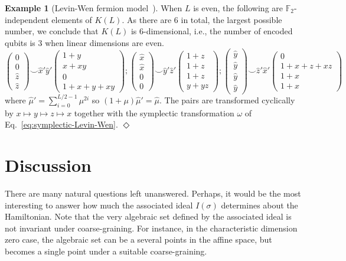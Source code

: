 \documentclass[letterpaper,12pt]{amsart}
\theoremstyle{definition} \newtheorem{defn}{Definition}
\theoremstyle{definition} \newtheorem{rem}{Remark}
\theoremstyle{definition} \newtheorem{example}{Example}
\newcommand{\FF}{\mathbb{F}}
\begin{document}
\begin{example}[Levin-Wen fermion model~\cite{LevinWen2003Fermions}]
When $L$ is even, the following are $\FF_2$-independent elements of $K(L)$.
As there are 6 in total, the largest possible number, we conclude that $K(L)$ is 6-dimensional,
i.e., the number of encoded qubits is 3 when linear dimensions are even.
\[
 \begin{pmatrix}  0 \\ 0 \\ \widehat z \\ \widehat z \end{pmatrix}
\smile
 \widehat x ' \widehat y '
 \begin{pmatrix}  1+y \\ x+xy \\ 0 \\ 1+x+y+xy \end{pmatrix}
%
 ;
%
 \begin{pmatrix}  \widehat x \\ \widehat x \\ 0 \\ 0 \end{pmatrix}
\smile
 \widehat y ' \widehat z '
 \begin{pmatrix}  1+z \\ 1+z \\ 1+z \\ y+yz \end{pmatrix}
%
  ;
%
 \begin{pmatrix}  \widehat y \\ \widehat y \\ \widehat y \\ \widehat y \end{pmatrix}
\smile 
 \widehat z ' \widehat x '
 \begin{pmatrix}  0 \\ 1+x+z+xz \\ 1+x \\ 1+x \end{pmatrix}
\]
where $\widehat \mu ' = \sum_{i=0}^{L/2-1} \mu^{2i}$ so $(1+\mu)\widehat \mu ' = \widehat \mu$.
The pairs are transformed cyclically by $x \mapsto y \mapsto z \mapsto x$
together with the symplectic transformation $\omega$ of Eq.~\eqref{eq:symplectic-Levin-Wen}.
%
\hfill $\Diamond$
\end{example}


\section{Discussion}

There are many natural questions left unanswered.
Perhaps, it would be the most interesting to answer how much 
the associated ideal $I(\sigma)$
determines about the Hamiltonian.
Note that the very algebraic set defined by the associated ideal
is not invariant under coarse-graining.
For instance, in the characteristic dimension zero case,
the algebraic set can be a several points in the affine space,
but becomes a single point under a suitable coarse-graining.
\end{document}
